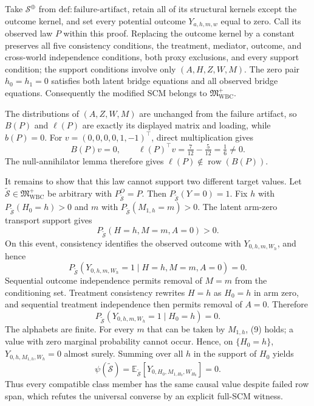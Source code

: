 Take \(\mathcal S^{\oplus}\) from
\(\mathrm{def{:}failure\text{-}artifact}\), retain all of its structural kernels
except the outcome kernel, and set every potential outcome \(Y_{a,h,m,w}\) equal
to zero.  Call its observed law \(P\) within this proof.  Replacing the outcome
kernel by a constant preserves all five consistency conditions, the treatment,
mediator, outcome, and cross-world independence conditions, both proxy
exclusions, and every support condition; the support conditions involve only
\((A,H,Z,W,M)\).  The zero pair \(h_0=h_1=0\) satisfies both latent bridge
equations and all observed bridge equations.  Consequently the modified SCM
belongs to \(\mathfrak M_{\mathrm{WBC}}^+\).

The distributions of \((A,Z,W,M)\) are unchanged from the failure artifact, so
\(B(P)\) and \(\ell(P)\) are exactly its displayed matrix and loading, while
\(b(P)=0\).  For \(v=(0,0,0,0,1,-1)^\top\), direct multiplication gives
\[
 B(P)v=0,
 \qquad
 \ell(P)^\top v=\tfrac7{12}-\tfrac5{12}=\tfrac16\ne0.
\]
The null-annihilator lemma therefore gives
\(\ell(P)\notin\operatorname{row}(B(P))\).

It remains to show that this law cannot support two different target values.
Let \(\widetilde{\mathcal S}\in\mathfrak M_{\mathrm{WBC}}^+\) be arbitrary with
\(P_{\widetilde{\mathcal S}}^O=P\).  Then
\(P_{\widetilde{\mathcal S}}(Y=0)=1\).  Fix \(h\) with
\(P_{\widetilde{\mathcal S}}(H_0=h)>0\) and \(m\) with
\(P_{\widetilde{\mathcal S}}(M_{1,h}=m)>0\).  The latent arm-zero transport
support gives
\[
 P_{\widetilde{\mathcal S}}(H=h,M=m,A=0)>0.
\]
On this event, consistency identifies the observed outcome with
\(Y_{0,h,m,W_h}\), and hence
\[
 P_{\widetilde{\mathcal S}}(Y_{0,h,m,W_h}=1
 \mid H=h,M=m,A=0)=0.
\]
Sequential outcome independence permits removal of \(M=m\) from the
conditioning set.  Treatment consistency rewrites \(H=h\) as \(H_0=h\) in arm
zero, and sequential treatment independence then permits removal of \(A=0\).
Therefore
\[
 P_{\widetilde{\mathcal S}}(Y_{0,h,m,W_h}=1\mid H_0=h)=0.
 \tag{9}
\]
The alphabets are finite.  For every \(m\) that can be taken by \(M_{1,h}\),
(9) holds; a value with zero marginal probability cannot occur.  Hence, on
\(\{H_0=h\}\),
\(Y_{0,h,M_{1,h},W_h}=0\) almost surely.  Summing over all \(h\) in the support of
\(H_0\) yields
\[
 \psi(\widetilde{\mathcal S})
 =\mathbb E_{\widetilde{\mathcal S}}
   [Y_{0,H_0,M_{1,H_0},W_{H_0}}]=0.
\]
Thus every compatible class member has the same causal value despite failed row
span, which refutes the universal converse by an explicit full-SCM witness.